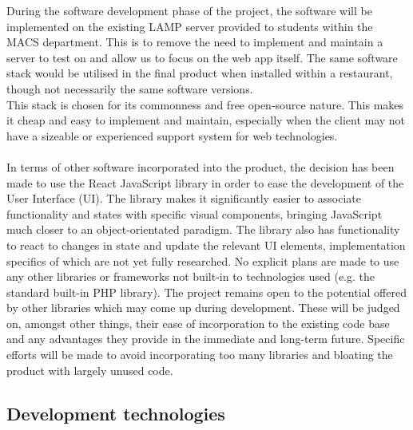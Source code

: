\documentclass[11pt, a4paper]{report}
\begin{document}
During the software development phase of the project, the software will be implemented on the existing LAMP server provided to students within the MACS department. This is to remove the need to implement and maintain a server to test on and allow us to focus on the web app itself. The same software stack would be utilised in the final product when installed within a restaurant, though not necessarily the same software versions.\\
This stack is chosen for its commonness and free open-source nature. This makes it cheap and easy to implement and maintain, especially when the client may not have a sizeable or experienced support system for web technologies.\\
\\
In terms of other software incorporated into the product, the decision has been made to use the React JavaScript library in order to ease the development of the User Interface (UI). The library makes it significantly easier to associate functionality and states with specific visual components, bringing JavaScript much closer to an object-orientated paradigm. The library also has functionality to react to changes in state and update the relevant UI elements, implementation specifics of which are not yet fully researched. No explicit plans are made to use any other libraries or frameworks not built-in to technologies used (e.g. the standard built-in PHP library). The project remains open to the potential offered by other libraries which may come up during development. These will be judged on, amongst other things, their ease of incorporation to the existing code base and any advantages they provide in the immediate and long-term future. Specific efforts will be made to avoid incorporating too many libraries and bloating the product with largely unused code.

\subsection{Development technologies}
\end{document}
